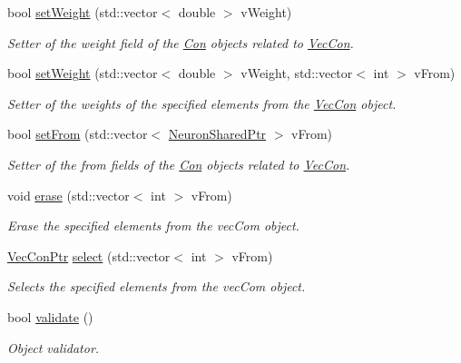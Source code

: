 \begin{DoxyCompactItemize}
bool \hyperlink{classvec_con_aed79ead4c7a01a8e34e5ed69da74e877}{setWeight} (std::vector$<$ double $>$ vWeight)
\begin{DoxyCompactList}\small\item\em Setter of the weight field of the \hyperlink{class_con}{Con} objects related to \hyperlink{classvec_con}{VecCon}. \end{DoxyCompactList}\item 
bool \hyperlink{classvec_con_a89a39247b0188b4fcc473c430ad46d4c}{setWeight} (std::vector$<$ double $>$ vWeight, std::vector$<$ int $>$ vFrom)
\begin{DoxyCompactList}\small\item\em Setter of the weights of the specified elements from the \hyperlink{classvec_con}{VecCon} object. \end{DoxyCompactList}\item 
bool \hyperlink{classvec_con_aa5ab6f399819f3a4ac0ba85adc1eb8d2}{setFrom} (std::vector$<$ \hyperlink{_a_m_o_r_e_8h_a03051950b0faf9499d14cf376e04c329}{NeuronSharedPtr} $>$ vFrom)
\begin{DoxyCompactList}\small\item\em Setter of the from fields of the \hyperlink{class_con}{Con} objects related to \hyperlink{classvec_con}{VecCon}. \end{DoxyCompactList}\item 
void \hyperlink{classvec_con_aa9cc2fde90ddf466e820f929ead4fb0b}{erase} (std::vector$<$ int $>$ vFrom)
\begin{DoxyCompactList}\small\item\em Erase the specified elements from the vecCom object. \end{DoxyCompactList}\item 
\hyperlink{_a_m_o_r_e_8h_a16f0806a3e5478c590c5b8ac41187e57}{VecConPtr} \hyperlink{classvec_con_a19b101dd0dcd24587a393a1eaa80dad0}{select} (std::vector$<$ int $>$ vFrom)
\begin{DoxyCompactList}\small\item\em Selects the specified elements from the vecCom object. \end{DoxyCompactList}\item 
bool \hyperlink{classvec_con_a7dc281e7258bf8be19a1591501c5434d}{validate} ()
\begin{DoxyCompactList}\small\item\em Object validator. \end{DoxyCompactList}\end{DoxyCompactItemize}



